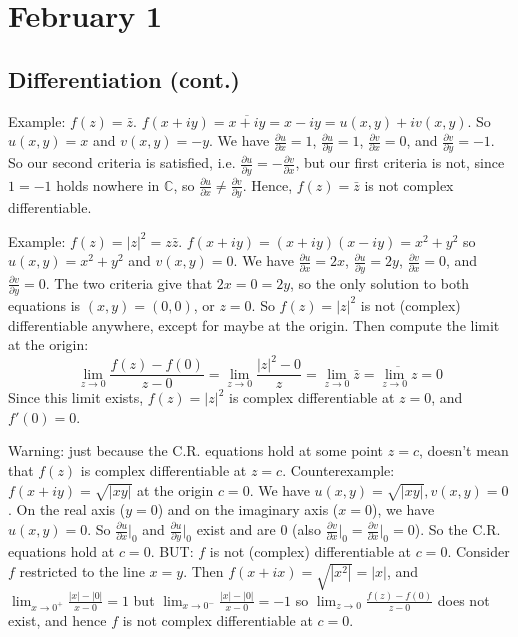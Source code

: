 \documentclass{article}
\theoremstyle{plain}
\theoremstyle{remark}
\newcommand{\C}{{\mathbb C}}
\begin{document}
\section{February 1}
\subsection{Differentiation (cont.)}
Example: $f(z) = \bar{z}$.
$f(x+iy) = \overline{x+iy} = x -iy = u(x,y) + iv(x,y)$.
So $u(x,y) = x$ and $v(x,y) = -y$.
We have $\frac{\partial u}{\partial x} = 1$,
$\frac{\partial u}{\partial y} = 1$, $\frac{\partial v}{\partial x} = 0$,
and $\frac{\partial v}{\partial y} = -1$.
So our second criteria is satisfied, i.e.
$\frac{\partial u}{\partial y} = -\frac{\partial v}{\partial x}$,
but our first criteria is not, since $1 = -1$ holds nowhere in $\C$,
so $\frac{\partial u}{\partial x} \neq \frac{\partial v}{\partial y}$.
Hence, $f(z) = \bar{z}$ is not complex differentiable.

Example: $f(z) = |z|^2 = z\bar{z}$.
$f(x+iy) = (x+iy)(x-iy) = x^2 + y^2$
so $u(x,y) = x^2 + y^2$ and $v(x,y) = 0$.
We have $\frac{\partial u}{\partial x} = 2x$, $\frac{\partial u}{\partial y} = 2y$,
$\frac{\partial v}{\partial x} = 0$, and $\frac{\partial v}{\partial y} = 0$.
The two criteria give that $2x = 0 = 2y$, so the only solution
to both equations is $(x,y) = (0,0)$, or $z = 0$.
So $f(z) = |z|^2$ is not (complex) differentiable anywhere,
except for maybe at the origin.
Then compute the limit at the origin:
\[
	\lim_{z \to 0} \frac{f(z) - f(0)}{z - 0}
	= \lim_{z \to 0}\frac{|z|^2 - 0}{z}
	= \lim_{z \to 0}\bar{z} = \overline{\lim_{z \to 0}z} = 0
\]
Since this limit exists, $f(z) = |z|^2$ is complex differentiable at $z = 0$,
and $f'(0) = 0$.

Warning: just because the C.R. equations hold at some point $z = c$,
doesn't mean that $f(z)$ is complex differentiable at $z = c$.
Counterexample: $f(x + iy) = \sqrt{|xy|}$ at the origin $c = 0$.
We have $u(x,y) = \sqrt{|xy|}, v(x,y) = 0$.
On the real axis ($y = 0$) and on the imaginary axis ($x = 0$),
we have $u(x,y) = 0$.
So $\frac{\partial u}{\partial x} \big \vert_0$ and
$\frac{\partial u}{\partial y} \big \vert_0$ exist and are $0$
(also $\frac{\partial v}{\partial x} \big \vert_0 =
\frac{\partial v}{\partial x} \big \vert_0 = 0$).
So the C.R. equations hold at $c = 0$.
BUT: $f$ is not (complex) differentiable at $c = 0$.
Consider $f$ restricted to the line $x = y$.
Then $f(x + ix) = \sqrt{|x^2|} = |x|$,
and $\lim_{x \to 0^+} \frac{|x| - |0|}{x-0} = 1$
but $\lim_{x \to 0^-} \frac{|x| - |0|}{x-0} = -1$
so $\lim_{z\to 0} \frac{f(z) - f(0)}{z-0}$ does not exist,
and hence $f$ is not complex differentiable at $c = 0$.
\end{document}
